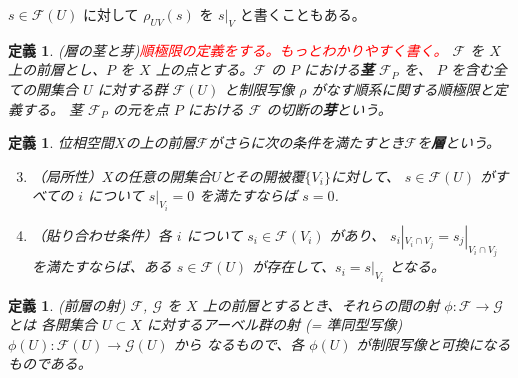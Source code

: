 \documentclass[uplatex, 12pt, dvipdfmx]{jsreport}
\newtheorem{dfn}[thm]{定義}
\newcommand{\mcF}{\mathcal{F}}
\newcommand{\mcG}{\mathcal{G}}
\begin{document}
$s \in \mcF(U)$ に対して $\rho_{UV}(s)$ を $s|_V$ と書くこともある。

\begin{dfn}{(層の茎と芽)\textcolor{red}{順極限の定義をする。もっとわかりやすく書く。}}
    $\mcF$ を $X$ 上の前層とし、$P$ を $X$ 上の点とする。$\mcF$ の $P$ における\textbf{茎} $\mcF_P$ を、
    $P$ を含む全ての開集合 $U$ に対する群 $\mcF(U)$ と制限写像 $\rho$ がなす順系に関する順極限と定義する。
    茎 $\mcF_P$ の元を点 $P$ における $\mcF$ の切断の\textbf{芽}という。
\end{dfn}

\begin{dfn}
    位相空間$X$の上の前層$\mcF$がさらに次の条件を満たすとき$\mcF$を\textbf{層}という。
    \begin{enumerate}
        \setcounter{enumi}{2}
        \item （局所性）$X$の任意の開集合$U$とその開被覆$\{V_i\}$に対して、
              $s \in \mcF(U)$ がすべての $i$ について $s|_{V_i} = 0$ を満たすならば $s = 0$.
        \item （貼り合わせ条件）各 $i$ について $s_i \in \mcF(V_i)$ があり、
              $s_i|_{V_i \cap V_j} = s_j|_{V_i \cap V_j}$　を満たすならば、ある $s \in \mcF(U)$
              が存在して、$s_i = s|_{V_i}$ となる。
    \end{enumerate}
\end{dfn}


\begin{dfn}{(前層の射)}
    $\mcF$, $\mcG$ を $X$ 上の前層とするとき、それらの間の射 $\phi: \mcF \to \mcG$ とは
    各開集合 $U \subset X$ に対するアーベル群の射 (= 準同型写像) $\phi(U): \mcF(U) \to \mcG(U)$ から
    なるもので、各 $\phi(U)$ が制限写像と可換になるものである。

\end{dfn}
\end{document}
